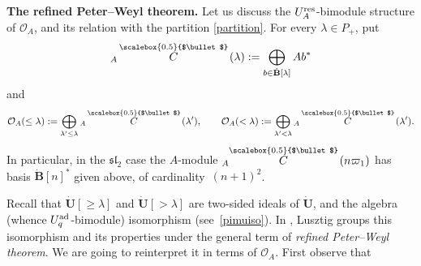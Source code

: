 \documentclass[pdftex]{sigma}
\numberwithin{equation}{section}
\theoremstyle{definition}
\newcommand{\Oo}{{\mathcal O}}
\newcommand{\ra}{\rightarrow}
\newcommand{\smallbullet}{%
\vcenter{\hbox{\,\scalebox{0.5}{$\bullet$}\,}}
}
\begin{document}
{\bf The refined Peter--Weyl theorem.} Let us discuss the $U_A^{\rm res}$-bimodule structure of $\Oo_A$, and its relation with the partition \eqref{partition}. For every $\lambda\in P_+$, put
\begin{equation}\label{AClambda}
{}_A \overset{\raisebox{-1.5pt}{\scriptsize$\smallbullet$}}{C} (\lambda) := \bigoplus_{b\in \dot{\mathbf{B}}[\lambda]} Ab^*
\end{equation}
and
\[\Oo_A(\leq \lambda) := \bigoplus_{\lambda'\leq \lambda} {}_A \overset{\raisebox{-1.5pt}{\scriptsize$\smallbullet$}}{C} (\lambda') ,\qquad \Oo_A(< \lambda) := \bigoplus_{\lambda'< \lambda} {}_A \overset{\raisebox{-1.5pt}{\scriptsize$\smallbullet$}}{C} (\lambda').\]
In particular, in the ${\mathfrak{sl}_2}$ case the $A$-module ${}_A\! \overset{\raisebox{-1.5pt}{\scriptsize$\smallbullet$}}{C} (n\varpi_1)$ has basis $\dot{\mathbf{B}} [n]^*$ given above, of cardinality~${(n+1)^2}$.

Recall that $\dot{\mathbf{U}} [\geq \lambda]$ and $\dot{\mathbf{U}} [> \lambda]$ are two-sided ideals of $\dot{\mathbf{U}}$, and the algebra (whence $U_q^{\rm ad}$-bimodule) isomorphism \smash{$\bar{\pi}_\lambda\colon \dot{\mathbf{U}} [\geq \lambda]/ \dot{\mathbf{U}} [> \lambda] \ra {\rm End}(V_\lambda)$} (see~\eqref{pimuiso}). In \cite[Section~29.3]{Lusztig}, Lusz\-tig groups this isomorphism and its properties under the general term of {\it refined Peter--Weyl theorem}. We are going to reinterpret it in terms of $\Oo_A$. First observe that
\end{document}
